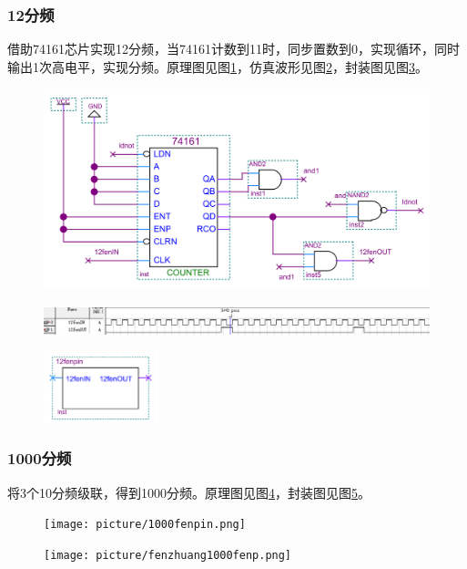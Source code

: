 \documentclass[12pt]{article}
\begin{document}
\subsubsection{12分频}
借助74161芯片实现12分频，当74161计数到11时，同步置数到0，实现循环，同时输出1次高电平，实现分频。原理图见图\ref{fig:12fenpin}，仿真波形见图\ref{fig:fangzhen12fenpin}，封装图见图\ref{fig:fengzhuang12fenpin}。
\begin{figure}[hp]
	\centering  
	\includegraphics[width=\textwidth]{picture/12fenp.png} 
	\caption{}
	\label{fig:12fenpin}   
\end{figure}
\begin{figure}[hp]
	\centering  
	\includegraphics[width=\textwidth]{picture/TIM20181210160106.png} 
	\caption{}
	\label{fig:fangzhen12fenpin}   
\end{figure}
\begin{figure}[hp]
	\centering  
	\includegraphics[width=0.3\textwidth]{picture/fenzhuang12fenp.png} 
	\caption{}
	\label{fig:fengzhuang12fenpin}   
\end{figure}
\subsubsection{1000分频}
将3个10分频级联，得到1000分频。原理图见图\ref{fig:1000fenpin}，封装图见图\ref{fig:fengzhuang1000fenpin}。
\begin{figure}[hp]
	\centering  
	\texttt{[image: picture/1000fenpin.png]} 
	\caption{}
	\label{fig:1000fenpin}   
\end{figure}
\begin{figure}[hp]
	\centering  
	\texttt{[image: picture/fenzhuang1000fenp.png]} 
	\caption{}
	\label{fig:fengzhuang1000fenpin}   
\end{figure}
\end{document}
